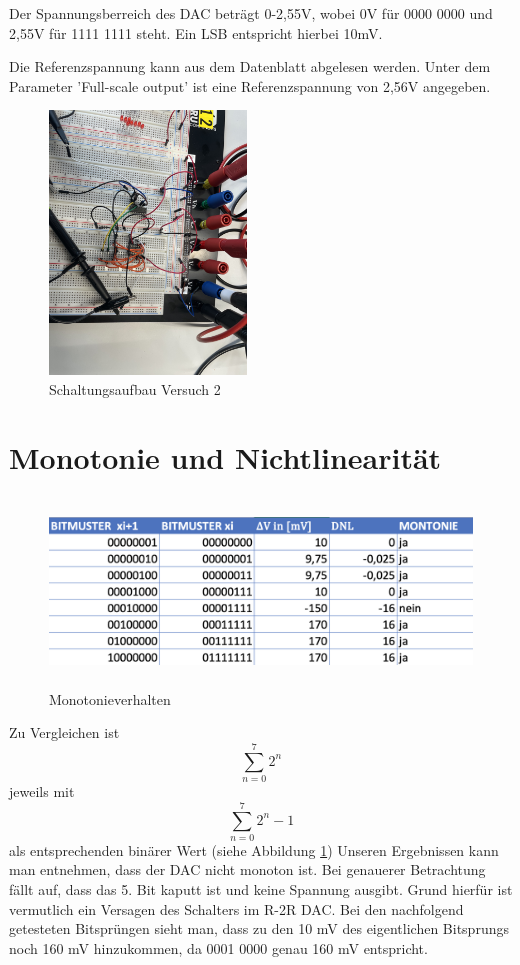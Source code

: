 Der Spannungsberreich des DAC beträgt 0-2,55V, wobei 0V für 0000 0000 
und 2,55V für 1111 1111 steht. Ein LSB entspricht hierbei 10mV.

Die Referenzspannung kann aus dem Datenblatt abgelesen werden. Unter dem 
Parameter 'Full-scale output' ist eine Referenzspannung von 2,56V angegeben.


\begin{figure}[H]
	\centering
	\includegraphics[height=7cm]{images/versuch2-schaltungsaufbau.jpeg} 
	\caption[]{Schaltungsaufbau Versuch 2}
\end{figure}



\section{Monotonie und Nichtlinearität}

\begin{figure}[H]
	\centering
	\includegraphics[height=5cm]{images/versuch2-monotonie-and-nichtlinearitaet.png} 
	\caption[]{Monotonieverhalten}
    \label{fig: Monotonieverhalten}
\end{figure}

Zu Vergleichen ist 
\[
\sum_{n=0}^{7} 2^n
\]
jeweils mit 
\[
\sum_{n=0}^{7} 2^n -1
\] als entsprechenden binärer Wert (siehe Abbildung \ref{fig: Monotonieverhalten})\newline
Unseren Ergebnissen kann man entnehmen, dass der DAC nicht
monoton ist. Bei genauerer Betrachtung fällt auf, dass das 5.
Bit kaputt ist und keine Spannung ausgibt. Grund hierfür ist 
vermutlich ein Versagen des Schalters im R-2R DAC.
Bei den nachfolgend getesteten Bitsprüngen sieht man, dass zu den
10 mV des eigentlichen Bitsprungs noch 160 mV hinzukommen, da 0001 0000
genau 160 mV entspricht.

